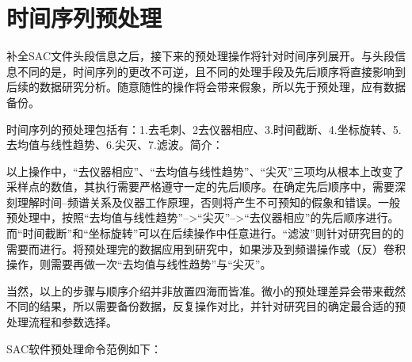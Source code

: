 \documentclass[a4paper]{article}
\begin{document}
\clearpage\section{时间序列预处理}
补全SAC文件头段信息之后，接下来的预处理操作将针对时间序列展开。与头段信息不同的是，时间序列的更改不可逆，且不同的处理手段及先后顺序将直接影响到后续的数据研究分析。随意随性的操作将会带来假象，所以先于预处理，应有数据备份。\par
时间序列的预处理包括有：1.去毛刺、2去仪器相应、3.时间截断、4.坐标旋转、5.去均值与线性趋势、6.尖灭、7.滤波。简介：\par
以上操作中，“去仪器相应”、“去均值与线性趋势”、“尖灭”三项均从根本上改变了采样点的数值，其执行需要严格遵守一定的先后顺序。在确定先后顺序中，需要深刻理解时间--频谱关系及仪器工作原理，否则将产生不可预知的假象和错误。一般预处理中，按照“去均值与线性趋势”-->“尖灭”-->“去仪器相应”的先后顺序进行。而“时间截断”和“坐标旋转”可以在后续操作中任意进行。“滤波”则针对研究目的的需要而进行。将预处理完的数据应用到研究中，如果涉及到频谱操作或（反）卷积操作，则需要再做一次“去均值与线性趋势”与“尖灭”。\par
当然，以上的步骤与顺序介绍并非放置四海而皆准。微小的预处理差异会带来截然不同的结果，所以需要备份数据，反复操作对比，并针对研究目的确定最合适的预处理流程和参数选择。\par
SAC软件预处理命令范例如下：\par
\end{document}
